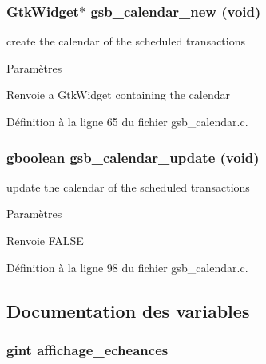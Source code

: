 \subsubsection[{gsb\_\-calendar\_\-new}]{\setlength{\rightskip}{0pt plus 5cm}GtkWidget$\ast$ gsb\_\-calendar\_\-new (void)}\label{gsb__calendar_8c_aec6d02bd75e77dbd63dbb3b1120fdf6b}
create the calendar of the scheduled transactions


\begin{DoxyParams}{Paramètres}
\item[{\em }]\end{DoxyParams}
\begin{DoxyReturn}{Renvoie}
a GtkWidget containing the calendar 
\end{DoxyReturn}


Définition à la ligne 65 du fichier gsb\_\-calendar.c.

\subsubsection[{gsb\_\-calendar\_\-update}]{\setlength{\rightskip}{0pt plus 5cm}gboolean gsb\_\-calendar\_\-update (void)}\label{gsb__calendar_8c_a97c1d6d132f4597521b5ec7bd8440cfb}
update the calendar of the scheduled transactions


\begin{DoxyParams}{Paramètres}
\item[{\em }]\end{DoxyParams}
\begin{DoxyReturn}{Renvoie}
FALSE 
\end{DoxyReturn}


Définition à la ligne 98 du fichier gsb\_\-calendar.c.



\subsection{Documentation des variables}
\subsubsection[{affichage\_\-echeances}]{\setlength{\rightskip}{0pt plus 5cm}gint {\bf affichage\_\-echeances}}\label{gsb__calendar_8c_ab762c5bee8904fe3e83e8c2dfdecd94d}


